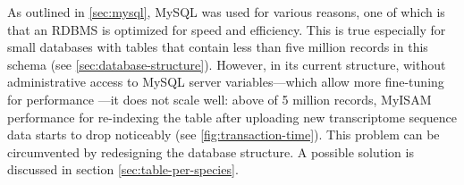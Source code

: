 \label{sec:mysql-performance}
As outlined in \autoref{sec:mysql}, MySQL was used for various reasons, one of
which is that an RDBMS is optimized for speed and efficiency. This is true
especially for small databases with tables that contain less than five million
records in this schema (see \autoref{sec:database-structure}). However, in its
current structure, without administrative access to MySQL server
variables---which allow more fine-tuning for performance
\citep{schwartz2012}---it does not scale well: above of 5 million records,
MyISAM performance for re-indexing the table after uploading new transcriptome
sequence data starts to drop noticeably (see \autoref{fig:transaction-time}). 
This problem can be circumvented by redesigning the database structure. A
possible solution is discussed in section \ref{sec:table-per-species}.



